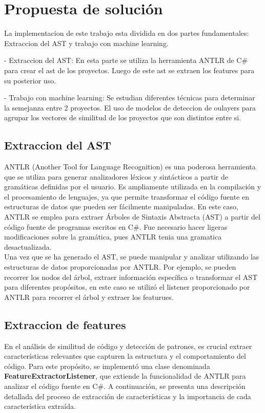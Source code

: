 \chapter{Propuesta de solución}\label{chapter:proposal}

La implementacion  de este trabajo esta dividida en dos partes fundamentales: Extraccion del AST y trabajo con machine learning.

- Extraccion del AST: En esta parte se utiliza la herramienta ANTLR de C\# para crear el ast de los proyectos. Luego de este ast se extraen los features para su posterior uso.

- Trabajo con machine learning: Se estudian diferentes técnicas para determinar la semejanza entre 2 proyectos. El uso de modelos de deteccion de oulayers para agrupar los vectores de similitud de los proyectos que son distintos entre si.


\section{Extraccion del AST}

ANTLR (Another Tool for Language Recognition) es una poderosa herramienta que se utiliza para generar analizadores léxicos y sintácticos a partir de gramáticas definidas por el usuario. Es ampliamente utilizada en la compilación y el procesamiento de lenguajes, ya que permite transformar el código fuente en estructuras de datos que pueden ser fácilmente manipuladas. En este caso, ANTLR se emplea para extraer Árboles de Sintaxis Abstracta (AST) a partir del código fuente de programas escritos en C\#. Fue necesario hacer ligeras modificaciones sobre la gramática, pues ANTLR tenia una gramatica desactualizada. \\

Una vez que se ha generado el AST, se puede manipular y analizar utilizando las estructuras de datos proporcionadas por ANTLR. Por ejemplo, se pueden recorrer los nodos del árbol, extraer información específica o transformar el AST para diferentes propósitos, en este caso se utilizó el listener proporcionado por ANTLR para recorrer el árbol y extraer los featurues. \\

\section{Extraccion de features}

En el análisis de similitud de código y detección de patrones, es crucial extraer características relevantes que capturen la estructura y el comportamiento del código. Para este propósito, se implementó una clase denominada {\bf FeatureExtractorListener}, que extiende la funcionalidad de ANTLR para analizar el código fuente en C\#. A continuación, se presenta una descripción detallada del proceso de extracción de características y la importancia de cada característica extraída. \\

